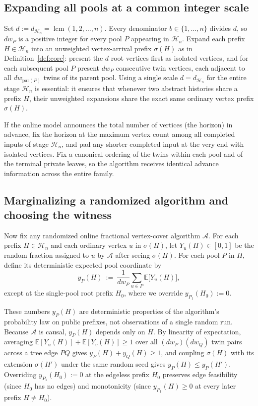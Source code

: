 \documentclass[11pt,letterpaper]{article}
\begin{document}
\subsection{Expanding all pools at a common integer scale}

Set $d := d_{\mathcal H_n} = \operatorname{lcm}(1,2,\ldots,n)$. Every denominator $b\in\{1,\ldots,n\}$ divides $d$, so $d w_P$ is a positive integer for every pool $P$ appearing in $\mathcal H_n$. Expand each prefix $H\in\mathcal H_n$ into an unweighted vertex-arrival prefix $\sigma(H)$ as in Definition~\ref{def:core}: present the $d$ root vertices first as isolated vertices, and for each subsequent pool $P$ present $d w_P$ consecutive twin vertices, each adjacent to all $d w_{\mathrm{par}(P)}$ twins of its parent pool. Using a single scale $d=d_{\mathcal H_n}$ for the entire stage $\mathcal H_n$ is essential: it ensures that whenever two abstract histories share a prefix $H$, their unweighted expansions share the exact same ordinary vertex prefix $\sigma(H)$.

If the online model announces the total number of vertices (the horizon) in advance, fix the horizon at the maximum vertex count among all completed inputs of stage $\mathcal H_n$, and pad any shorter completed input at the very end with isolated vertices. Fix a canonical ordering of the twins within each pool and of the terminal private leaves, so the algorithm receives identical advance information across the entire family.

\subsection{Marginalizing a randomized algorithm and choosing the witness}

Now fix any randomized online fractional vertex-cover algorithm $\mathcal A$. For each prefix $H\in\mathcal H_n$ and each ordinary vertex $u$ in $\sigma(H)$, let $Y_u(H)\in[0,1]$ be the random fraction assigned to $u$ by $\mathcal A$ after seeing $\sigma(H)$. For each pool $P$ in $H$, define its deterministic expected pool coordinate by
\[
  y_P(H)\ :=\ \frac{1}{d w_P}\sum_{u\in P} \mathbb E\bigl[Y_u(H)\bigr],
\]
except at the single-pool root prefix $H_0$, where we override $y_{P_1}(H_0):=0$.

These numbers $y_P(H)$ are deterministic properties of the algorithm's probability law on public prefixes, not observations of a single random run. Because $\mathcal A$ is causal, $y_P(H)$ depends only on $H$. By linearity of expectation, averaging $\mathbb E[Y_u(H)]+\mathbb E[Y_v(H)]\ge 1$ over all $(d w_P)(d w_Q)$ twin pairs across a tree edge $PQ$ gives $y_P(H)+y_Q(H)\ge 1$, and coupling $\sigma(H)$ with its extension $\sigma(H')$ under the same random seed gives $y_P(H)\le y_P(H')$. Overriding $y_{P_1}(H_0):=0$ at the edgeless prefix $H_0$ preserves edge feasibility (since $H_0$ has no edges) and monotonicity (since $y_{P_1}(H)\ge 0$ at every later prefix $H\neq H_0$).
\end{document}
